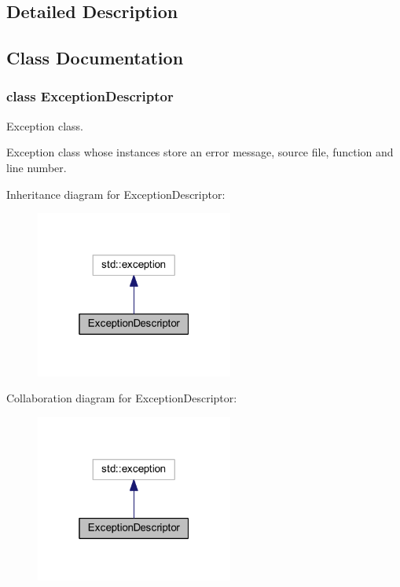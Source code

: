 \subsection{Detailed Description}


\subsection{Class Documentation}
\label{class_exception_descriptor}
\hypertarget{group___core_class_exception_descriptor}{}
\subsubsection{class Exception\-Descriptor}
Exception class. 

Exception class whose instances store an error message, source file, function and line number. 

Inheritance diagram for Exception\-Descriptor\-:
\nopagebreak
\begin{figure}[H]
\begin{center}
\leavevmode
\includegraphics[width=184pt]{class_exception_descriptor__inherit__graph}
\end{center}
\end{figure}


Collaboration diagram for Exception\-Descriptor\-:
\nopagebreak
\begin{figure}[H]
\begin{center}
\leavevmode
\includegraphics[width=184pt]{class_exception_descriptor__coll__graph}
\end{center}
\end{figure}
